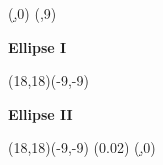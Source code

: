 

\Defdim(\d,0)
\Defdim(\e,9)


\begin{center}
{\Huge \bf{Ellipse I}}
\bigskip

\begin{lapdf}(18,18)(-9,-9)
\end{lapdf}
\end{center}

\newpage

\begin{center}
{\Huge \bf{Ellipse II}}
\bigskip

\begin{lapdf}(18,18)(-9,-9)
 \Setwidth(0.02)
 \Dset(\d,0)
\end{lapdf}
\end{center}

